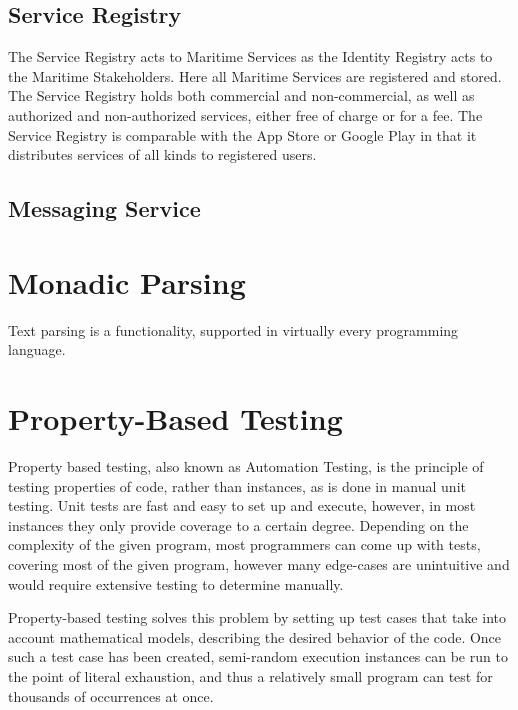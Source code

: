 \subsection{Service Registry}
The Service Registry acts to Maritime Services as the Identity Registry acts to the Maritime Stakeholders. Here all Maritime Services are registered and stored. The Service Registry holds both commercial and non-commercial, as well as authorized and non-authorized services, either free of charge or for a fee. The Service Registry is comparable with the App Store or Google Play in that it distributes services of all kinds to registered users.\cite{efficienSea2}
\subsection{Messaging Service}
\cite{efficienSea2}

\section{Monadic Parsing}

Text parsing is a functionality, supported in virtually every programming language.

\section{Property-Based Testing}

Property based testing, also known as Automation Testing, is the principle of testing properties of code, rather than instances, as is done in manual unit testing. Unit tests are fast and easy to set up and execute, however, in most instances they only provide coverage to a certain degree. Depending on the complexity of the given program, most programmers can come up with tests, covering most of the given program, however many edge-cases are unintuitive and would require extensive testing to determine manually.

Property-based testing solves this problem by setting up test cases that take into account mathematical models, describing the desired behavior of the code. Once such a test case has been created, semi-random execution instances can be run to the point of literal exhaustion, and thus a relatively small program can test for thousands of occurrences at once.

